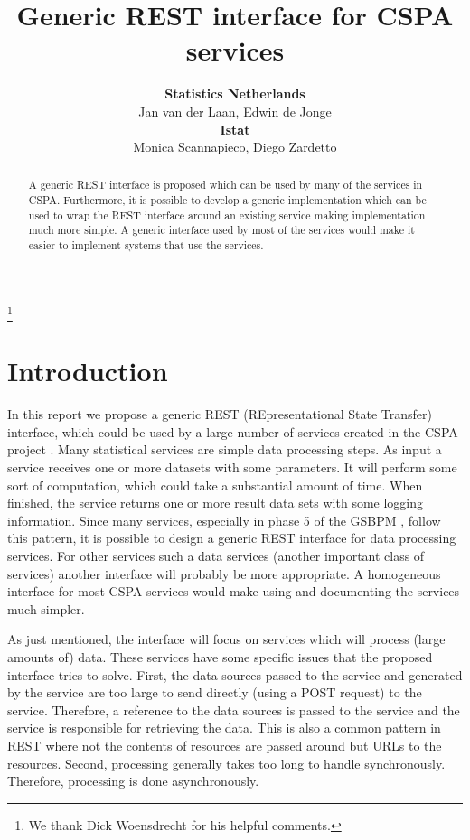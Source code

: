 \documentclass[a4paper]{article}
\title{Generic REST interface for CSPA services}
\author{\textbf{Statistics Netherlands}\\ 
Jan van der Laan, Edwin de Jonge\\[1ex]
\textbf{Istat}\\
Monica Scannapieco, Diego Zardetto%
}
\newcommand\blfootnote[1]{%
  \begingroup
  \renewcommand\thefootnote{}\footnote{#1}%
  \addtocounter{footnote}{-1}%
  \endgroup
}
\begin{document}
\maketitle

\blfootnote{We thank Dick Woensdrecht for his helpful comments.}

\begin{abstract}
A generic REST interface is proposed which can be used by many of the services
in CSPA. Furthermore, it is possible to develop a generic implementation which
can be used to wrap the REST interface around an existing service making
implementation much more simple. A generic interface used by most of the
services would make it easier to implement systems that use the services.
\end{abstract}

\section{Introduction}

In this report we propose a generic REST (REpresentational State Transfer)
interface, which could be used by a large number of services created in the
CSPA project \citep{cspa2013}. Many statistical services are simple data
processing steps. As input a service receives one or more datasets with some
parameters. It will perform some sort of computation, which could take a
substantial amount of time.  When finished, the service returns one or more
result data sets with some logging information.  Since many services,
especially in phase 5 of the GSBPM \citep{gsbpm2013}, follow this pattern, it
is possible to design a generic REST interface for data processing services. For
other services such a data services (another important class of services)
another interface will probably be more appropriate.  A homogeneous interface
for most CSPA services would make using and documenting the services much
simpler. 

As just mentioned, the interface will focus on services which will process (large
amounts of) data. These services have some specific issues that the proposed
interface tries to solve. First, the data sources passed to the service and
generated by the service are too large to send directly (using a POST
request) to the service.  Therefore, a reference to the data sources is passed
to the service and the service is responsible for retrieving the data. This is
also a common pattern in REST where not the contents of resources are passed
around but URLs to the resources.  Second, processing generally takes too long
to handle synchronously. Therefore, processing is done asynchronously.  
\end{document}
